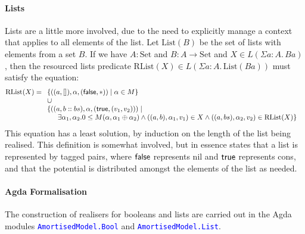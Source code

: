\documentclass[acmsmall,screen]{acmart}
\newcommand{\Set}{\mathrm{Set}}
\newcommand{\AgdaModule}[1]{\textcolor{blue}{\tt #1}}
\begin{document}
\paragraph{Lists} Lists are a little more involved, due to the need to
explicitly manage a context that applies to all elements of the
list. Let $\mathrm{List}(B)$ be the set of lists with elements from a
set $B$. If we have $A : \Set$ and $B : A \to \Set$ and
$X \in L(\Sigma a:A.\, B a)$, then the resourced lists predicate
$\mathrm{RList}(X) \in L(\Sigma a : A.\, \mathrm{List}(B a))$ must
satisfy the equation:
\begin{displaymath}
  \mathrm{RList}(X) =
  \begin{array}[t]{l}
    \{ ((a, []), \alpha, (\synFalse, *)) \mid \alpha \in M \} \\
    \cup \\
    \{ \begin{array}[t]{@{}l}
         ((a, b :: bs), \alpha, (\synTrue, (v_1, v_2))) \mid \\
         \quad \exists \alpha_1, \alpha_2. 0 \leq M(\alpha, \alpha_1 \oplus \alpha_2) \land ((a, b), \alpha_1, v_1) \in X \land ((a, bs), \alpha_2, v_2) \in \mathrm{RList}(X) \}
       \end{array}
  \end{array}
\end{displaymath}
This equation has a least solution, by induction on the length of the
list being realised. This definition is somewhat involved, but in
essence states that a list is represented by tagged pairs, where
$\mathsf{false}$ represents nil and $\mathsf{true}$ represents cons, and that
the potential is distributed amongst the elements of the list as
needed.

\paragraph{Agda Formalisation} The construction of realisers for
booleans and lists are carried out in the Agda modules
\AgdaModule{AmortisedModel.Bool} and \AgdaModule{AmortisedModel.List}.


\end{document}
